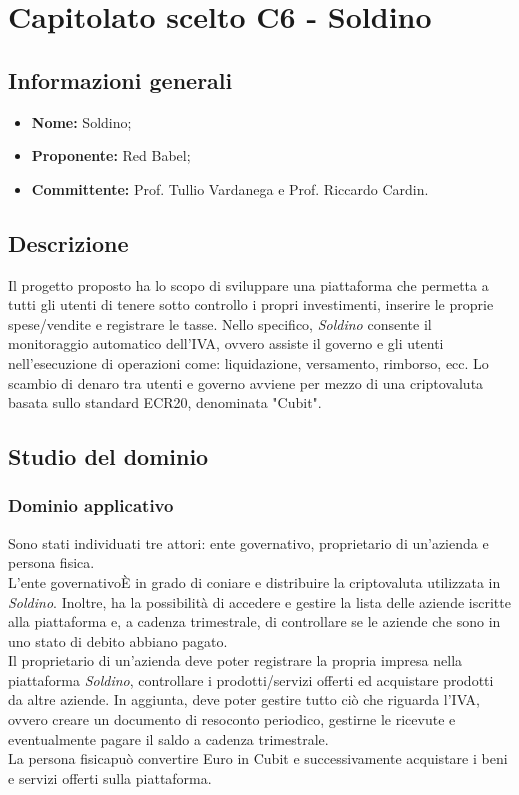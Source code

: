 \section{Capitolato scelto C6 - Soldino}
\subsection{Informazioni generali}
% 
\begin{itemize}
\item \textbf{Nome:} Soldino;
\item \textbf{Proponente:} Red Babel;
\item \textbf{Committente:} Prof. Tullio Vardanega e Prof. Riccardo Cardin.
\end{itemize}

\subsection{Descrizione}
Il progetto proposto ha lo scopo di sviluppare una piattaforma che permetta a 
tutti gli utenti di tenere sotto controllo i propri investimenti, inserire le 
proprie spese/vendite e registrare le tasse. Nello specifico, \textit{Soldino} 
consente il monitoraggio automatico dell'IVA, ovvero assiste il governo e gli 
utenti nell'esecuzione di operazioni come: liquidazione, versamento, rimborso, 
ecc. Lo scambio di denaro tra utenti e governo avviene per mezzo di una 
criptovaluta basata sullo standard ECR20\glo{}, denominata "Cubit"\glo{}. 


\subsection{Studio del dominio}
\subsubsection{Dominio applicativo}
Sono stati individuati tre attori: ente governativo, proprietario di un'azienda 
e persona fisica. \\
L'ente governativo\`E in grado di coniare e distribuire la 
criptovaluta utilizzata in \textit{Soldino}. Inoltre, ha la possibilità di 
accedere e gestire la lista delle aziende iscritte alla piattaforma e, a cadenza 
trimestrale, di controllare se le aziende che sono in uno stato di debito 
abbiano pagato. \\
Il proprietario di un'azienda deve poter registrare la propria 
impresa nella piattaforma \textit{Soldino}, controllare i prodotti/servizi 
offerti ed acquistare prodotti da altre aziende. In aggiunta, deve poter gestire
tutto ciò che riguarda l'IVA, ovvero creare un documento di resoconto periodico,
gestirne le ricevute e eventualmente pagare il saldo a cadenza trimestrale. \\
La persona fisica\glo può convertire Euro in Cubit e 
successivamente acquistare i beni e servizi offerti sulla piattaforma. 

